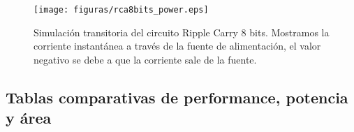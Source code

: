 \begin{figure}
  \centering
\texttt{[image: figuras/rca8bits\_power.eps]}
  \caption{Simulación transitoria del circuito Ripple Carry 8 bits. Mostramos la corriente instantánea a través de la fuente de alimentación, el valor negativo se debe a que la corriente sale de la fuente. }
\label{fig:sim_rca8_pow}
\end{figure}

\subsection{Tablas comparativas de
 performance, potencia y área}










